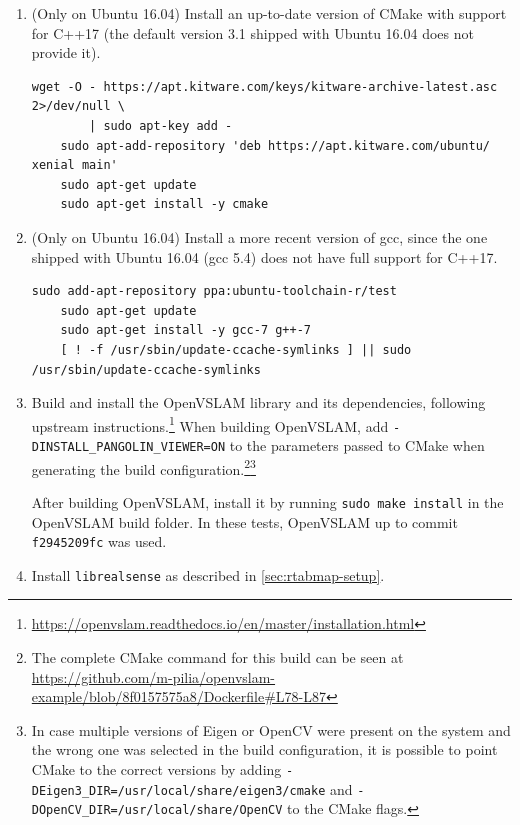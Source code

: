 \documentclass[11pt, letterpaper, twoside]{article}
\begin{document}
\begin{enumerate}
    \item (Only on Ubuntu 16.04) Install an up-to-date version of CMake with
        support for C++17 (the default version 3.1 shipped with Ubuntu 16.04
        does not provide it).
\begin{Verbatim}[samepage=true]
    wget -O - https://apt.kitware.com/keys/kitware-archive-latest.asc 2>/dev/null \
        | sudo apt-key add -
    sudo apt-add-repository 'deb https://apt.kitware.com/ubuntu/ xenial main'
    sudo apt-get update
    sudo apt-get install -y cmake
\end{Verbatim}

    \item (Only on Ubuntu 16.04) Install a more recent version of gcc, since
        the one shipped with Ubuntu 16.04 (gcc 5.4) does not have full support
        for C++17.
\begin{Verbatim}[samepage=true]
    sudo add-apt-repository ppa:ubuntu-toolchain-r/test
    sudo apt-get update
    sudo apt-get install -y gcc-7 g++-7
    [ ! -f /usr/sbin/update-ccache-symlinks ] || sudo /usr/sbin/update-ccache-symlinks
\end{Verbatim}

    \item Build and install the OpenVSLAM library and its dependencies,
        following upstream
        instructions.\footnote{\url{https://openvslam.readthedocs.io/en/master/installation.html}}
        When building OpenVSLAM, add \texttt{-DINSTALL\_PANGOLIN\_VIEWER=ON} to
        the parameters passed to CMake when generating the build
        configuration.\footnote{The complete CMake command for this build can
        be seen at
        \url{https://github.com/m-pilia/openvslam-example/blob/8f0157575a8/Dockerfile\#L78-L87}}\footnote{In
        case multiple versions of Eigen or OpenCV were present on the system
        and the wrong one was selected in the build configuration, it is
        possible to point CMake to the correct versions by adding
        \texttt{-DEigen3\_DIR=/usr/local/share/eigen3/cmake} and
        \texttt{-DOpenCV\_DIR=/usr/local/share/OpenCV} to the CMake flags.}

        After building OpenVSLAM, install it by running \texttt{sudo make
        install} in the OpenVSLAM build folder. In these tests, OpenVSLAM up to
        commit \texttt{f2945209fc} was used.

    \item Install \texttt{librealsense} as described in
        \cref{sec:rtabmap-setup}.


\end{enumerate}
\end{document}
